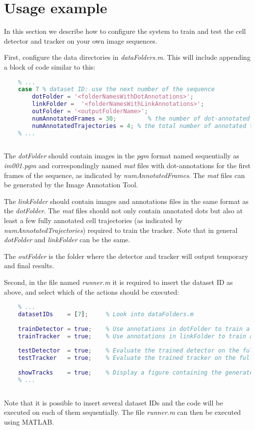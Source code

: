 	\section{Usage example}
	
	In this section we describe how to configure the system to train and test the cell detector and tracker on your own image sequences.
	
	First, configure the data directories in \textit{dataFolders.m}. This will include appending a block of code similar to this:
	
	
	\begin{lstlisting}[language=Matlab]
	% dataFolders.m
	% ...
	case 7 % dataset ID: use the next number of the sequence
		dotFolder = '<folderNamesWithDotAnnotations>';
		linkFolder =  '<folderNamesWithLinkAnnotations>';
		outFolder = '<outputFolderName>';
		numAnnotatedFrames = 30;         % the number of dot-annotated frames 
		numAnnotatedTrajectories = 4; % the total number of annotated trajectories
	% ...
		        
	\end{lstlisting}
	
	The \textit{dotFolder} should contain images in the \textit{pgm} format named sequentially as \textit{im001.pgm} and correspondingly named \textit{mat} files with dot-annotations for the first frames of the sequence, as indicated by \textit{numAnnotatedFrames}. The \textit{mat} files can be generated by the Image Annotation Tool.
	
	The \textit{linkFolder} should contain images and annotations files in the same format as the \textit{dotFolder}. The \textit{mat} files should not only contain annotated dots but also at least a few fully annotated cell trajectories (as indicated by \textit{numAnnotatedTrajectories}) required to train the tracker. Note that in general \textit{dotFolder} and \textit{linkFolder} can be the same.
	
	The \textit{outFolder} is the folder where the detector and tracker will output temporary and final results.
	
	
	
	Second, in the file named \textit{runner.m} it is required to insert the dataset ID as above, and select which of the actions should be executed:
	
	
	\begin{lstlisting}[language=Matlab]
	% runner.m
	% ...
	datasetIDs    = [7];     % Look into dataFolders.m
	
	trainDetector = true;    % Use annotations in dotFolder to train a new detector
	trainTracker  = true;    % Use annotations in linkFolder to train a new tracker
	
	testDetector  = true;    % Evaluate the trained detector on the full image sequence
	testTracker   = true;    % Evaluate the trained tracker on the full image sequence
	
	showTracks    = true;    % Display a figure containing the generated trajectories
	% ...
       
	\end{lstlisting}
	
	Note that it is possible to insert several dataset IDs and the code will be executed on each of them sequentially. The file \textit{runner.m} can then be executed using MATLAB.
	

